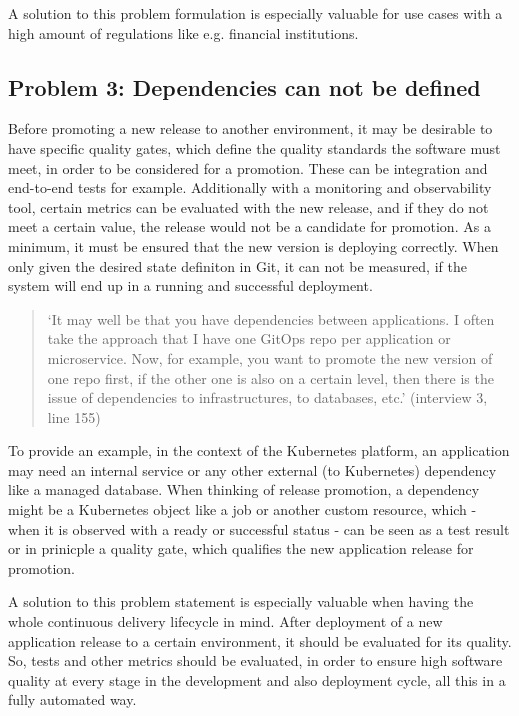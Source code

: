 A solution to this problem formulation is especially valuable for
use cases with a high amount of regulations like e.g. financial institutions.

\subsection{Problem 3: Dependencies can not be defined}
\label{problem3}

Before promoting a new release to another environment,
it may be desirable to have specific
quality gates, which define the quality standards the
software must meet, in order to be considered for a promotion.
These can be integration and end-to-end tests for example.
Additionally with a monitoring and observability tool,
certain metrics can be evaluated with the new release,
and if they do not meet a certain value, the release would not
be a candidate for promotion.
As a minimum, it must be ensured that the new version is 
deploying correctly. When only given the desired state definiton
in Git, it can not be measured, if the system will end up in a running
and successful deployment.

\begin{quotation}
	\noindent
	\enquote*{It may well be that you have dependencies between applications. I often take the approach that I have one GitOps repo per application or microservice. Now, for example, you want to promote the new version of one repo first, if the other one is also on a certain level, then there is the issue of dependencies to infrastructures, to databases, etc.}
	(interview 3, line 155)
\end{quotation}

To provide an example, in the context of the Kubernetes platform,
an application may need an internal service or any other external (to Kubernetes)
dependency like a managed database.
When thinking of release promotion,
a dependency might be a Kubernetes object like a job or another custom resource,
which - when it is observed with a ready or successful status -
can be seen as a test result or in prinicple a quality gate, which qualifies the
new application release for promotion.

A solution to this problem statement is especially valuable when having the whole
continuous delivery lifecycle in mind. After deployment of a new application release
to a certain environment, it should be evaluated for its quality. So, tests
and other metrics should be evaluated, in order to ensure high software quality
at every stage in the development and also deployment cycle,
all this in a fully automated way.

